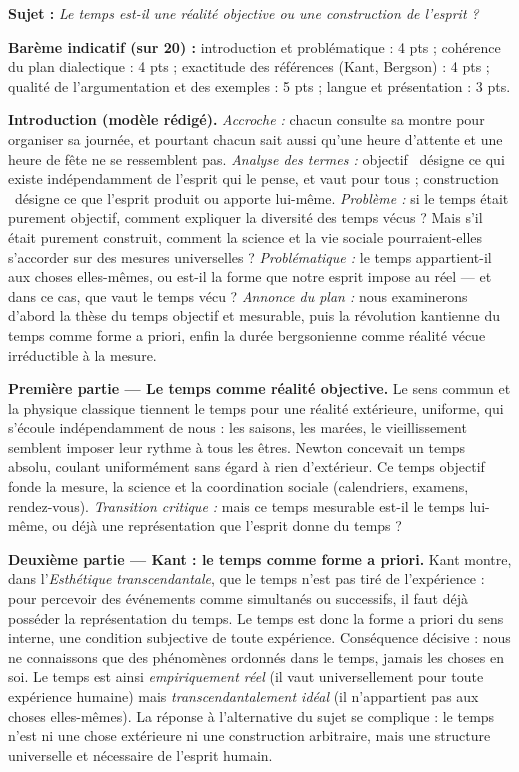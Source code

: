 \documentclass[11pt]{article}
\newcommand{\cle}[1]{{\popxbold\color{popdark}#1}}
\begin{document}
\begin{corrige}

\textbf{Sujet :} \emph{Le temps est-il une réalité objective ou une construction de l'esprit ?}

\tcblower

\textbf{Barème indicatif (sur 20) :} introduction et problématique : 4 pts ; cohérence du plan dialectique : 4 pts ; exactitude des références (Kant, Bergson) : 4 pts ; qualité de l'argumentation et des exemples : 5 pts ; langue et présentation : 3 pts.

\textbf{Introduction (modèle rédigé).} \emph{Accroche :} chacun consulte sa montre pour organiser sa journée, et pourtant chacun sait aussi qu'une heure d'attente et une heure de fête ne se ressemblent pas. \emph{Analyse des termes :} \guillemotleft objectif \guillemotright\ désigne ce qui existe indépendamment de l'esprit qui le pense, et vaut pour tous ; \guillemotleft construction \guillemotright\ désigne ce que l'esprit produit ou apporte lui-même. \emph{Problème :} si le temps était purement objectif, comment expliquer la diversité des temps vécus ? Mais s'il était purement construit, comment la science et la vie sociale pourraient-elles s'accorder sur des mesures universelles ? \emph{Problématique :} le temps appartient-il aux choses elles-mêmes, ou est-il la forme que notre esprit impose au réel — et dans ce cas, que vaut le temps vécu ? \emph{Annonce du plan :} nous examinerons d'abord la thèse du temps objectif et mesurable, puis la révolution kantienne du temps comme forme a priori, enfin la durée bergsonienne comme réalité vécue irréductible à la mesure.

\textbf{Première partie — Le temps comme réalité objective.} Le sens commun et la physique classique tiennent le temps pour une réalité extérieure, uniforme, qui s'écoule indépendamment de nous : les saisons, les marées, le vieillissement semblent imposer leur rythme à tous les êtres. Newton concevait un temps absolu, coulant uniformément sans égard à rien d'extérieur. Ce temps objectif fonde la mesure, la science et la coordination sociale (calendriers, examens, rendez-vous). \emph{Transition critique :} mais ce temps mesurable est-il le temps lui-même, ou déjà une représentation que l'esprit donne du temps ?

\textbf{Deuxième partie — Kant : le temps comme forme a priori.} Kant montre, dans l'\emph{Esthétique transcendantale}, que le temps n'est pas tiré de l'expérience : pour percevoir des événements comme simultanés ou successifs, il faut déjà posséder la représentation du temps. Le temps est donc la \cle{forme a priori du sens interne}, une condition subjective de toute expérience. Conséquence décisive : nous ne connaissons que des phénomènes ordonnés dans le temps, jamais les choses en soi. Le temps est ainsi \emph{empiriquement réel} (il vaut universellement pour toute expérience humaine) mais \emph{transcendantalement idéal} (il n'appartient pas aux choses elles-mêmes). La réponse à l'alternative du sujet se complique : le temps n'est ni une chose extérieure ni une construction arbitraire, mais une structure universelle et nécessaire de l'esprit humain.


\end{corrige}
\end{document}
